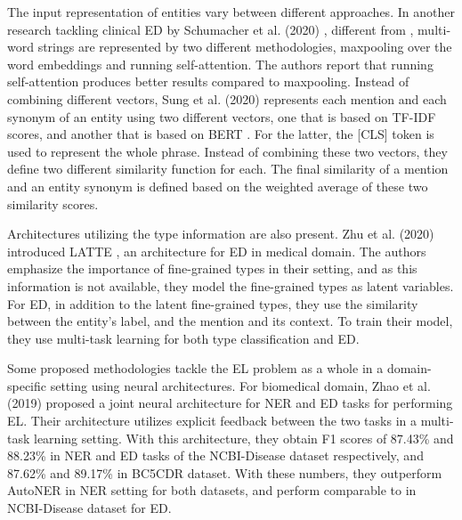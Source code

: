 \documentclass{report}
\theoremstyle{definition}
\theoremstyle{remark}
\begin{document}
The input representation of entities vary between different approaches. In another research tackling clinical ED by Schumacher et al. (2020) \cite{ClinicalConcept}, different from \cite{MedicalTriplet},  multi-word strings are represented by two different methodologies, maxpooling over the word embeddings and running self-attention. The authors report that running self-attention produces better results compared to maxpooling. Instead of combining different vectors, Sung et al. (2020) \cite{sung-etal} represents each mention and each synonym of an entity using two different vectors, one that is based on TF-IDF scores, and another that is based on BERT \cite{BERT}. For the latter, the [CLS] token is used to represent the whole phrase. Instead of combining these two vectors, they define two different similarity function for each. The final similarity of a mention and an entity synonym is defined based on the weighted average of these two similarity scores.

Architectures utilizing the type information are also present. Zhu et al. (2020) introduced LATTE \cite{latte}, an architecture for ED in medical domain. The authors emphasize the importance of fine-grained types in their setting, and as this information is not available, they model the fine-grained types as latent variables. For ED, in addition to the latent fine-grained types, they use the similarity between the entity's label, and the mention and its context. To train their model, they use multi-task learning for both type classification and ED.

Some proposed methodologies tackle the EL problem as a whole in a domain-specific setting using neural architectures. For biomedical domain, Zhao et al. (2019) \cite{MedFeedback} proposed a joint neural architecture for NER and ED tasks for performing EL. Their architecture utilizes explicit feedback between the two tasks in a multi-task learning setting. With this architecture, they obtain F1 scores of 87.43\% and 88.23\% in NER and ED tasks of the NCBI-Disease \cite{ncbi} dataset respectively, and 87.62\% and 89.17\% in BC5CDR \cite{bc5cdr} dataset. With these numbers, they outperform AutoNER \cite{NERDict2} in NER setting for both datasets, and perform comparable to \cite{MedicalTriplet} in NCBI-Disease dataset for ED.
\end{document}
